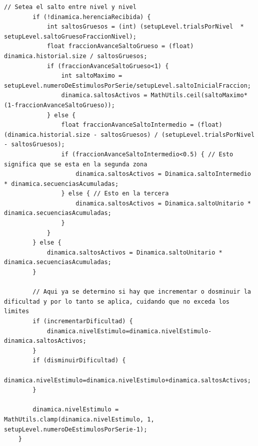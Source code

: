 \documentclass{article}
\begin{document}
\begin{lstlisting}[caption=Código que se ejecuta al recibir la información de una respuesta dada por el usuario]
		// Setea el salto entre nivel y nivel
		if (!dinamica.herenciaRecibida) {
			int saltosGruesos = (int) (setupLevel.trialsPorNivel  * setupLevel.saltoGruesoFraccionNivel);
			float fraccionAvanceSaltoGrueso = (float) dinamica.historial.size / saltosGruesos;
			if (fraccionAvanceSaltoGrueso<1) {
				int saltoMaximo = setupLevel.numeroDeEstimulosPorSerie/setupLevel.saltoInicialFraccion;
				dinamica.saltosActivos = MathUtils.ceil(saltoMaximo*(1-fraccionAvanceSaltoGrueso));
			} else { 
				float fraccionAvanceSaltoIntermedio = (float) (dinamica.historial.size - saltosGruesos) / (setupLevel.trialsPorNivel - saltosGruesos);
				if (fraccionAvanceSaltoIntermedio<0.5) { // Esto significa que se esta en la segunda zona
					dinamica.saltosActivos = Dinamica.saltoIntermedio * dinamica.secuenciasAcumuladas;
				} else { // Esto en la tercera
					dinamica.saltosActivos = Dinamica.saltoUnitario * dinamica.secuenciasAcumuladas;
				}
			}
		} else {
			dinamica.saltosActivos = Dinamica.saltoUnitario * dinamica.secuenciasAcumuladas;
		}
		
		// Aqui ya se determino si hay que incrementar o dosminuir la dificultad y por lo tanto se aplica, cuidando que no exceda los limites
		if (incrementarDificultad) {
			dinamica.nivelEstimulo=dinamica.nivelEstimulo-dinamica.saltosActivos;
		}
		if (disminuirDificultad) {
			dinamica.nivelEstimulo=dinamica.nivelEstimulo+dinamica.saltosActivos;
		}
			
		dinamica.nivelEstimulo = MathUtils.clamp(dinamica.nivelEstimulo, 1, setupLevel.numeroDeEstimulosPorSerie-1);
	}


 \end{lstlisting}
\end{document}
